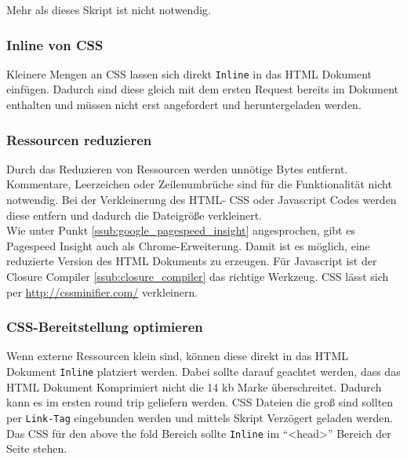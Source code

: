 			Mehr als dieses Skript ist nicht notwendig.
				

		\subsubsection{Inline von CSS} %
		\label{ssub:inline_von_css}
			Kleinere Mengen an CSS lassen sich direkt \texttt{Inline} in das HTML Dokument einfügen. Dadurch sind diese gleich mit dem ersten Request bereits im Dokument enthalten und müssen nicht erst angefordert und heruntergeladen werden.

		\subsubsection{Ressourcen reduzieren} %
		\label{ssub:ressourcen_reduzieren}
			Durch das Reduzieren von Ressourcen werden unnötige Bytes entfernt. Kommentare, Leerzeichen oder Zeilenumbrüche sind für die Funktionalität nicht notwendig. Bei der Verkleinerung des HTML- CSS oder Javascript Codes werden diese entfern und dadurch die Dateigröße verkleinert.\\

			Wie unter Punkt \ref{ssub:google_pagespeed_insight} angesprochen, gibt es Pagespeed Insight auch als Chrome-Erweiterung. Damit ist es möglich, eine reduzierte Version des HTML Dokuments zu erzeugen. Für Javascript ist der Closure Compiler \ref{ssub:closure_compiler} das richtige Werkzeug. CSS lässt sich per \url{http://cssminifier.com/} verkleinern.

		\subsubsection{CSS-Bereitstellung optimieren} %
		\label{ssub:css_bereitstellung_optimieren}
			Wenn externe Ressourcen klein sind, können diese direkt in das HTML Dokument \texttt{Inline} platziert werden. Dabei sollte darauf geachtet werden, dass das HTML Dokument Komprimiert nicht die 14 kb Marke überschreitet. Dadurch kann es im ersten round trip geliefern werden. CSS Dateien die groß sind sollten per \texttt{Link-Tag} eingebunden werden und mittels Skript Verzögert geladen werden. Das CSS für den above the fold Bereich sollte \texttt{Inline} im "`<head>"' Bereich der Seite stehen. 

